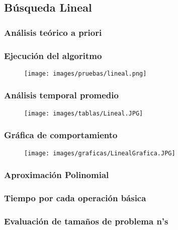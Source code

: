 \documentclass[12pt]{article}
\begin{document}
	    \subsection{Búsqueda Lineal}
	        \subsubsection{Análisis teórico a priori}
	        
	        \subsubsection{Ejecución del algoritmo}
            	\begin{figure}[H]
                	   \centering
                	   \texttt{[image: images/pruebas/lineal.png]}
                \end{figure}
	        
	        \subsubsection{Análisis temporal promedio}
            	\begin{figure}[H]
            	    \centering
                	   \texttt{[image: images/tablas/Lineal.JPG]}
                \end{figure}
        	
        	\subsubsection{Gráfica de comportamiento}
            	\begin{figure}[H]
            	    \centering
                	   \texttt{[image: images/graficas/LinealGrafica.JPG]}
                \end{figure}
    
        	\subsubsection{Aproximación Polinomial}
    
        	\subsubsection{Tiempo por cada operación básica}
    
        	\subsubsection{Evaluación de tamaños de problema n's}
    
\end{document}
